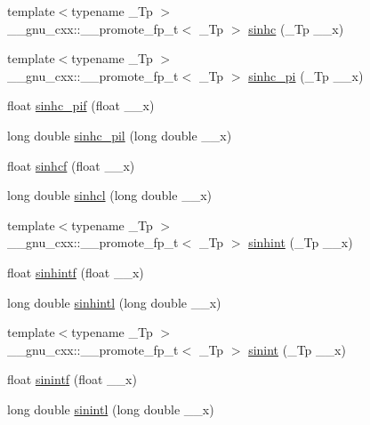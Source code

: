 \begin{DoxyCompactItemize}
\item 
{\footnotesize template$<$typename \+\_\+\+Tp $>$ }\\\+\_\+\+\_\+gnu\+\_\+cxx\+::\+\_\+\+\_\+promote\+\_\+fp\+\_\+t$<$ \+\_\+\+Tp $>$ \hyperlink{group__gnu__math__spec__func_gabafa26d8a2e592a0e080beae71ccbb7e}{sinhc} (\+\_\+\+Tp \+\_\+\+\_\+x)
\item 
{\footnotesize template$<$typename \+\_\+\+Tp $>$ }\\\+\_\+\+\_\+gnu\+\_\+cxx\+::\+\_\+\+\_\+promote\+\_\+fp\+\_\+t$<$ \+\_\+\+Tp $>$ \hyperlink{group__gnu__math__spec__func_ga56bea42a4701761e82567f7100d9ca5e}{sinhc\+\_\+pi} (\+\_\+\+Tp \+\_\+\+\_\+x)
\item 
float \hyperlink{group__gnu__math__spec__func_ga26e54504db6541550266140f5264acbe}{sinhc\+\_\+pif} (float \+\_\+\+\_\+x)
\item 
long double \hyperlink{group__gnu__math__spec__func_gaa572bf7633f457c86cef65bfd6ec4ad9}{sinhc\+\_\+pil} (long double \+\_\+\+\_\+x)
\item 
float \hyperlink{group__gnu__math__spec__func_gadaa7ea78625cc2eeb70213a50719813d}{sinhcf} (float \+\_\+\+\_\+x)
\item 
long double \hyperlink{group__gnu__math__spec__func_ga7467a001bb18ef8bff0a7e9927bab356}{sinhcl} (long double \+\_\+\+\_\+x)
\item 
{\footnotesize template$<$typename \+\_\+\+Tp $>$ }\\\+\_\+\+\_\+gnu\+\_\+cxx\+::\+\_\+\+\_\+promote\+\_\+fp\+\_\+t$<$ \+\_\+\+Tp $>$ \hyperlink{group__gnu__math__spec__func_ga203079a2b70127f16a8c434ea55d4e06}{sinhint} (\+\_\+\+Tp \+\_\+\+\_\+x)
\item 
float \hyperlink{group__gnu__math__spec__func_ga375ca3ceb1eafd678e298d0aea4bb3e6}{sinhintf} (float \+\_\+\+\_\+x)
\item 
long double \hyperlink{group__gnu__math__spec__func_ga8b7f1a070be7233a3179e3cbded387ee}{sinhintl} (long double \+\_\+\+\_\+x)
\item 
{\footnotesize template$<$typename \+\_\+\+Tp $>$ }\\\+\_\+\+\_\+gnu\+\_\+cxx\+::\+\_\+\+\_\+promote\+\_\+fp\+\_\+t$<$ \+\_\+\+Tp $>$ \hyperlink{group__gnu__math__spec__func_gaa588265d28710d36c7c4efa7d4f44ca4}{sinint} (\+\_\+\+Tp \+\_\+\+\_\+x)
\item 
float \hyperlink{group__gnu__math__spec__func_ga8b63406fec50d7e00470521b82fb32a2}{sinintf} (float \+\_\+\+\_\+x)
\item 
long double \hyperlink{group__gnu__math__spec__func_ga3ff83e5c5f1435064b6942ca8b7c8779}{sinintl} (long double \+\_\+\+\_\+x)

\end{DoxyCompactItemize}
